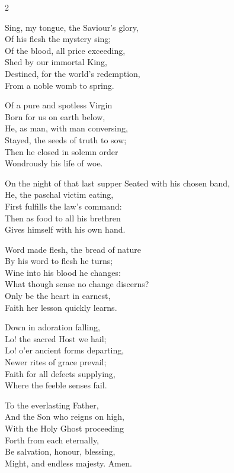 \begin{multicols}{2}
\raggedcolumns
\begin{enpars}
Sing, my tongue, the Saviour's glory,\\
Of his flesh the mystery sing;\\
Of the blood, all price exceeding,\\
Shed by our immortal King,\\
Destined, for the world's redemption,\\
From a noble womb to spring.

Of a pure and spotless Virgin\\
Born for us on earth below,\\
He, as man, with man conversing,\\
Stayed, the seeds of truth to sow;\\
Then he closed in solemn order\\
Wondrously his life of woe.

On the night of that last supper
Seated with his chosen band,\\
He, the paschal victim eating,\\
First fulfills the law's command:\\
Then as food to all his brethren\\
Gives himself with his own hand.

Word made flesh, the bread of nature\\
By his word to flesh he turns;\\
Wine into his blood he changes:\\
What though sense no change discerns?\\
Only be the heart in earnest,\\
Faith her lesson quickly learns.

Down in adoration falling,\\
Lo! the sacred Host we hail;\\
Lo! o'er ancient forms departing,\\
Newer rites of grace prevail;\\
Faith for all defects supplying,\\
Where the feeble senses fail.

To the everlasting Father,\\
And the Son who reigns on high,\\
With the Holy Ghost proceeding\\
Forth from each eternally,\\
Be salvation, honour, blessing,\\
Might, and endless majesty.
Amen.\end{enpars}
\end{multicols}